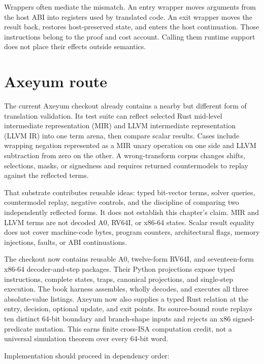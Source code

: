Wrappers often mediate the mismatch. An entry wrapper moves arguments from the
host ABI into registers used by translated code. An exit wrapper moves the
result back, restores host-preserved state, and enters the host continuation.
Those instructions belong to the proof and cost account. Calling them
runtime support does not place their effects outside semantics.

\section{Axeyum route}

The current Axeyum checkout already contains a nearby but different form of
translation validation. Its test suite can reflect selected Rust mid-level
intermediate representation (MIR) and LLVM intermediate representation (LLVM
IR) into one term arena, then compare scalar results. Cases include wrapping
negation represented as a MIR unary operation on one side and LLVM subtraction
from zero on the other. A wrong-transform corpus changes shifts, selections,
masks, or signedness and requires returned countermodels to replay against the
reflected terms.

That substrate contributes reusable ideas: typed bit-vector terms, solver
queries, countermodel replay, negative controls, and the discipline of
comparing two independently reflected forms. It does not establish this
chapter's claim. MIR and LLVM terms are not decoded A0, RV64I, or x86-64
states. Scalar result equality does not cover machine-code bytes, program
counters, architectural flags, memory injections, faults, or ABI
continuations.

The checkout now contains reusable A0, twelve-form RV64I, and seventeen-form
x86-64 decoder-and-step packages. Their Python projections expose typed
instructions, complete states, traps, canonical projections, and single-step
execution. The book harness assembles, wholly decodes, and executes all three
absolute-value listings. Axeyum now also supplies a typed Rust relation at the
entry, decision, optional update, and exit points. Its source-bound route
replays ten distinct 64-bit boundary and branch-shape inputs and rejects an
x86 signed-predicate mutation. This earns finite cross-ISA computation credit,
not a universal simulation theorem over every 64-bit word.


Implementation should proceed in dependency order:


